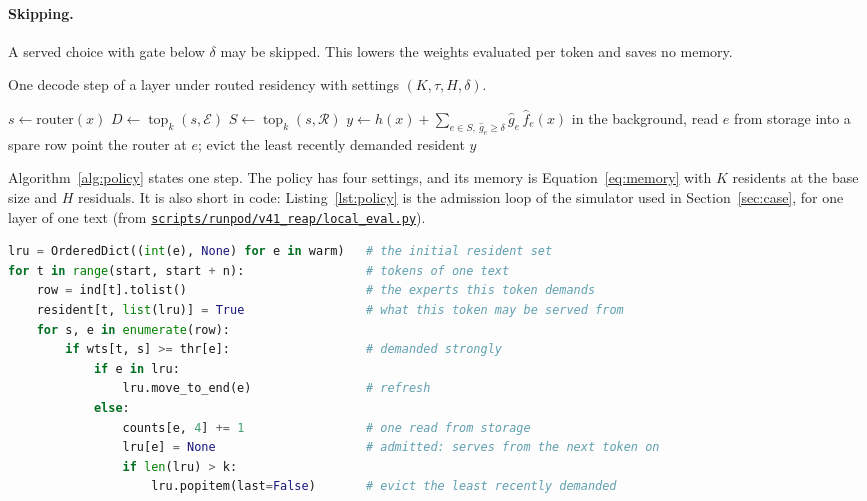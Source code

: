 \documentclass[11pt]{article}
\newcommand{\pool}{\mathcal{E}}
\newcommand{\res}{\mathcal{R}}
\newcommand{\topk}{\operatorname{top}_k}
\newcommand{\repo}{https://github.com/jackmaxwil/keep}
\newcommand{\src}[1]{\href{\repo/blob/main/#1}{\nolinkurl{#1}}}
\begin{document}
\paragraph{Skipping.} A served choice with gate below $\delta$ may be skipped. This lowers the
weights evaluated per token and saves no memory.

\begin{algorithm}[t]
\caption{One decode step of a layer under routed residency with settings $(K,\tau,H,\delta)$.}
\label{alg:policy}
\begin{algorithmic}[1]
\State $s\gets\mathrm{router}(x)$
\State $D\gets\topk(s,\pool)$ 
\State $S\gets\topk(s,\res)$ 
\State $y\gets h(x)+\sum_{e\in S,\ \hat g_e\ge\delta} \hat g_e\,\hat f_e(x)$ 
\ForAll{$e\in D\setminus\res$ with $g^D_e\ge\tau$}
  \State in the background, read $e$ from storage into a spare row
  \State point the router at $e$; evict the least recently demanded resident
\EndFor
\State \Return $y$ 
\end{algorithmic}
\end{algorithm}

Algorithm~\ref{alg:policy} states one step. The policy has four settings, and its memory is
Equation~\ref{eq:memory} with $K$ residents at the base size and $H$ residuals. It is also
short in code: Listing~\ref{lst:policy} is the admission loop of the simulator used in
Section~\ref{sec:case}, for one layer of one text (from \src{scripts/runpod/v41_reap/local_eval.py}).

\begin{lstlisting}[float=t, language=Python, caption={The admission loop of our simulator for one layer of one text (abridged, comments added). \texttt{ind} and \texttt{wts} hold each token's demanded experts and gate weights; \texttt{resident} is what the forward pass then serves from.}, label={lst:policy}]
lru = OrderedDict((int(e), None) for e in warm)   # the initial resident set
for t in range(start, start + n):                 # tokens of one text
    row = ind[t].tolist()                         # the experts this token demands
    resident[t, list(lru)] = True                 # what this token may be served from
    for s, e in enumerate(row):
        if wts[t, s] >= thr[e]:                   # demanded strongly
            if e in lru:
                lru.move_to_end(e)                # refresh
            else:
                counts[e, 4] += 1                 # one read from storage
                lru[e] = None                     # admitted: serves from the next token on
                if len(lru) > k:
                    lru.popitem(last=False)       # evict the least recently demanded
\end{lstlisting}
\end{document}
